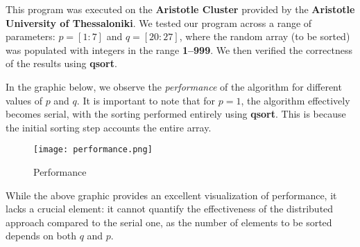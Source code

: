 \documentclass[12pt]{report}
\begin{document}
\begin{center}
\end{center}

This program was executed on the \textbf{Aristotle Cluster} provided by the \textbf{Aristotle University of Thessaloniki}. We tested our program across a range of parameters: $p = [1:7]$ and $q = [20:27]$, where the random array (to be sorted) was populated with integers in the range \textbf{1–999}. We then verified the correctness of the results using \textbf{qsort}. \newpage

In the graphic below, we observe the \textit{performance} of the algorithm for different values of $p$ and $q$. It is important to note that for $p=1$, the algorithm effectively becomes serial, with the sorting performed entirely using \textbf{qsort}. This is because the initial sorting step accounts the entire array.

\begin{figure}[H]
    \centering
    \texttt{[image: performance.png]}
    \caption{Performance}
    \label{fig:enter-label}
\end{figure}
\vspace{0.5cm}

While the above graphic provides an excellent visualization of performance, it lacks a crucial element: it cannot quantify the effectiveness of the distributed approach compared to the serial one, as the number of elements to be sorted depends on both $q$ and $p$.
\end{document}
